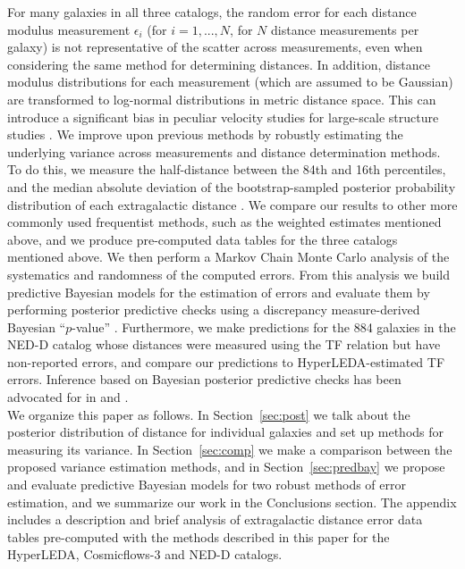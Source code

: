 \documentclass[a4paper,fleqn,usenatbib]{mnras}
\begin{document}
For many galaxies in all three catalogs, the random error for each distance modulus measurement $\epsilon_i$ (for $i=1,...,N$, for $N$ distance measurements per galaxy) is not representative of the scatter across measurements, even when considering the same method for determining distances. In addition, distance modulus distributions for each measurement (which are assumed to be Gaussian) are transformed to log-normal distributions in metric distance space. This can introduce a significant bias in peculiar velocity studies for large-scale structure studies \citep{lognormal}. We improve upon previous methods by robustly estimating the underlying variance across measurements and distance determination methods. To do this, we measure the half-distance between the 84th and 16th percentiles, and the median absolute deviation of the bootstrap-sampled posterior probability distribution of each extragalactic distance \citep{chaparro18}. We compare our results to other more commonly used frequentist methods, such as the weighted estimates mentioned above, and we produce pre-computed data tables for the three catalogs mentioned above. We then perform a Markov Chain Monte Carlo analysis of the systematics and randomness of the computed errors. From this analysis we build predictive Bayesian models for the estimation of errors and evaluate them by performing posterior predictive checks using a discrepancy measure-derived Bayesian ``$p$-value'' \citep{gelmanppd}. Furthermore, we make predictions for the 884 galaxies in the NED-D catalog whose distances were measured using the TF relation but have non-reported errors, and compare our predictions to HyperLEDA-estimated TF errors. Inference based on Bayesian posterior predictive checks has been advocated for in \citet{gelman2003} and \citet{ppcinf}.\\

We organize this paper as follows. In Section~\ref{sec:post} we talk about the posterior distribution of distance for individual galaxies and set up methods for measuring its variance. In Section~\ref{sec:comp} we make a comparison between the proposed variance estimation methods, and in Section~\ref{sec:predbay} we propose and evaluate predictive Bayesian models for two robust methods of error estimation, and we summarize our work in the Conclusions section. The appendix includes a description and brief analysis of extragalactic distance error data tables pre-computed with the methods described in this paper for the HyperLEDA, Cosmicflows-3 and NED-D catalogs.
\end{document}
